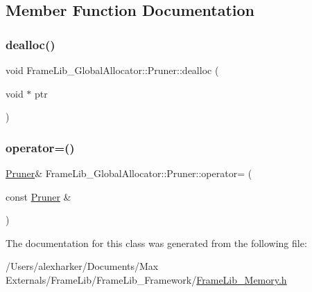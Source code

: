 \subsection{Member Function Documentation}
\mbox{\label{class_frame_lib___global_allocator_1_1_pruner_ad261c2fb12e19ce40ed3af4c550c479c}} 
\subsubsection{\texorpdfstring{dealloc()}{dealloc()}}
{\footnotesize\ttfamily void Frame\+Lib\+\_\+\+Global\+Allocator\+::\+Pruner\+::dealloc (\begin{DoxyParamCaption}\item[{void $\ast$}]{ptr }\end{DoxyParamCaption})\hspace{0.3cm}{\ttfamily [inline]}}

\mbox{\label{class_frame_lib___global_allocator_1_1_pruner_a223ed75d883318ef6d350ab9ce48bdc2}} 
\subsubsection{\texorpdfstring{operator=()}{operator=()}}
{\footnotesize\ttfamily \hyperlink{class_frame_lib___global_allocator_1_1_pruner}{Pruner}\& Frame\+Lib\+\_\+\+Global\+Allocator\+::\+Pruner\+::operator= (\begin{DoxyParamCaption}\item[{const \hyperlink{class_frame_lib___global_allocator_1_1_pruner}{Pruner} \&}]{ }\end{DoxyParamCaption})\hspace{0.3cm}{\ttfamily [delete]}}



The documentation for this class was generated from the following file\+:\begin{DoxyCompactItemize}
\item 
/\+Users/alexharker/\+Documents/\+Max Externals/\+Frame\+Lib/\+Frame\+Lib\+\_\+\+Framework/\hyperlink{_frame_lib___memory_8h}{Frame\+Lib\+\_\+\+Memory.\+h}\end{DoxyCompactItemize}
